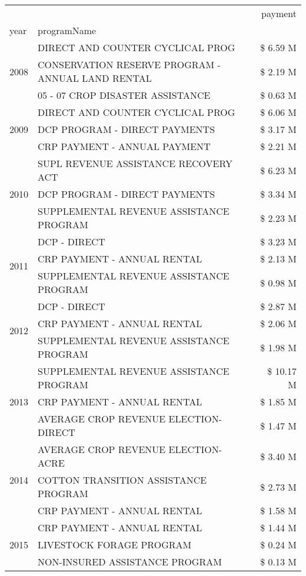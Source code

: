 \begin{tabular}{llr}
\toprule
 &  & payment \\
year & programName &  \\
\midrule
\multirow[t]{3}{*}{2008} & DIRECT AND COUNTER CYCLICAL PROG & \$ 6.59 M \\
 & CONSERVATION RESERVE PROGRAM - ANNUAL LAND RENTAL & \$ 2.19 M \\
 & 05 - 07 CROP DISASTER ASSISTANCE & \$ 0.63 M \\
\cline{1-3}
\multirow[t]{3}{*}{2009} & DIRECT AND COUNTER CYCLICAL PROG & \$ 6.06 M \\
 & DCP PROGRAM - DIRECT PAYMENTS & \$ 3.17 M \\
 & CRP PAYMENT - ANNUAL PAYMENT & \$ 2.21 M \\
\cline{1-3}
\multirow[t]{3}{*}{2010} & SUPL REVENUE ASSISTANCE RECOVERY ACT & \$ 6.23 M \\
 & DCP PROGRAM - DIRECT PAYMENTS & \$ 3.34 M \\
 & SUPPLEMENTAL REVENUE ASSISTANCE PROGRAM & \$ 2.23 M \\
\cline{1-3}
\multirow[t]{3}{*}{2011} & DCP - DIRECT & \$ 3.23 M \\
 & CRP PAYMENT - ANNUAL RENTAL & \$ 2.13 M \\
 & SUPPLEMENTAL REVENUE ASSISTANCE PROGRAM & \$ 0.98 M \\
\cline{1-3}
\multirow[t]{3}{*}{2012} & DCP - DIRECT & \$ 2.87 M \\
 & CRP PAYMENT - ANNUAL RENTAL & \$ 2.06 M \\
 & SUPPLEMENTAL REVENUE ASSISTANCE PROGRAM & \$ 1.98 M \\
\cline{1-3}
\multirow[t]{3}{*}{2013} & SUPPLEMENTAL REVENUE ASSISTANCE PROGRAM & \$ 10.17 M \\
 & CRP PAYMENT - ANNUAL RENTAL & \$ 1.85 M \\
 & AVERAGE CROP REVENUE ELECTION-DIRECT & \$ 1.47 M \\
\cline{1-3}
\multirow[t]{3}{*}{2014} & AVERAGE CROP REVENUE ELECTION-ACRE & \$ 3.40 M \\
 & COTTON TRANSITION ASSISTANCE PROGRAM & \$ 2.73 M \\
 & CRP PAYMENT - ANNUAL RENTAL & \$ 1.58 M \\
\cline{1-3}
\multirow[t]{3}{*}{2015} & CRP PAYMENT - ANNUAL RENTAL & \$ 1.44 M \\
 & LIVESTOCK FORAGE PROGRAM & \$ 0.24 M \\
 & NON-INSURED ASSISTANCE PROGRAM & \$ 0.13 M \\

\end{tabular}
